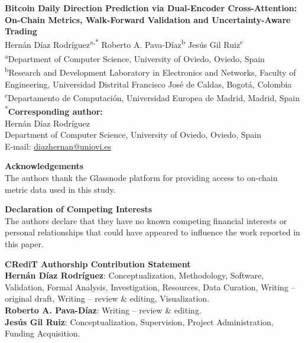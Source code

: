 \documentclass[a4paper,12pt]{article}
\begin{document}
\begin{center}
  {\Large\bfseries Bitcoin Daily Direction Prediction via Dual-Encoder
  Cross-Attention: On-Chain Metrics, Walk-Forward Validation and
  Uncertainty-Aware Trading}\\[1.5em]

  {\large
    Hern{\'a}n D{\'i}az Rodr{\'i}guez\textsuperscript{a,*} \quad
    Roberto A. Pava-D{\'i}az\textsuperscript{b} \quad
    Jes{\'u}s Gil Ruiz\textsuperscript{c}
  }\\[0.8em]

  \textsuperscript{a}Department of Computer Science, University of Oviedo, Oviedo, Spain\\
  \textsuperscript{b}Research and Development Laboratory in Electronics and Networks,
  Faculty of Engineering, Universidad Distrital Francisco Jos{\'e} de Caldas,
  Bogot{\'a}, Colombia\\
  \textsuperscript{c}Departamento de Computaci{\'o}n, Universidad Europea de Madrid,
  Madrid, Spain\\[0.5em]

  \textsuperscript{*}\textbf{Corresponding author:}\\
  Hern{\'a}n D{\'i}az Rodr{\'i}guez\\
  Department of Computer Science, University of Oviedo, Oviedo, Spain\\
  E-mail: \href{mailto:diazhernan@uniovi.es}{diazhernan@uniovi.es}
\end{center}

\bigskip

\noindent\textbf{Acknowledgements}\\
The authors thank the Glassnode platform for providing access to on-chain
metric data used in this study.

\bigskip

\noindent\textbf{Declaration of Competing Interests}\\
The authors declare that they have no known competing financial interests
or personal relationships that could have appeared to influence the work
reported in this paper.

\bigskip

\noindent\textbf{CRediT Authorship Contribution Statement}\\
\textbf{Hern{\'a}n D{\'i}az Rodr{\'i}guez}: Conceptualization, Methodology, Software,
Validation, Formal Analysis, Investigation, Resources, Data Curation,
Writing -- original draft, Writing -- review \& editing, Visualization.\\
\textbf{Roberto A. Pava-D{\'i}az}: Writing -- review \& editing.\\
\textbf{Jes{\'u}s Gil Ruiz}: Conceptualization, Supervision, Project Administration,
Funding Acquisition.
\end{document}
